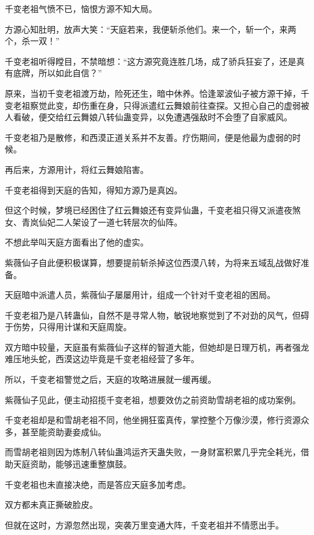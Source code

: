 
\begin{this_body}

千变老祖气愤不已，恼恨方源不知大局。

方源心知肚明，放声大笑：“天庭若来，我便斩杀他们。来一个，斩一个，来两个，杀一双！”

千变老祖听得瞠目，不禁暗想：“这方源究竟连胜几场，成了骄兵狂妄了，还是真有底牌，所以如此自信？”

原来，当初千变老祖渡万劫，险死还生，暗中休养。恰逢翠波仙子被方源干掉，千变老祖察觉此变，却伤重在身，只得派遣红云舞娘前往查探。又担心自己的虚弱被人看破，便交给红云舞娘八转仙蛊变异，以免遭遇强敌时不会堕了自家威风。

千变老祖乃是散修，和西漠正道关系并不友善。疗伤期间，便是他最为虚弱的时候。

再后来，方源用计，将红云舞娘陷害。

千变老祖得到天庭的告知，得知方源乃是真凶。

但这个时候，梦境已经困住了红云舞娘还有变异仙蛊，千变老祖只得又派遣夜煞女、青岚仙妃二人架设了一道七转层次的仙阵。

不想此举叫天庭方面看出了他的虚实。

紫薇仙子自此便积极谋算，想要提前斩杀掉这位西漠八转，为将来五域乱战做好准备。

天庭暗中派遣人员，紫薇仙子屡屡用计，组成一个针对千变老祖的困局。

千变老祖乃是八转蛊仙，自然不是寻常人物，敏锐地察觉到了不对劲的风气，但碍于伤势，只得用计谋和天庭周旋。

双方暗中较量，天庭虽有紫薇仙子这样的智道大能，但她却是日理万机，再者强龙难压地头蛇，西漠这边毕竟是千变老祖经营了多年。

所以，千变老祖警觉之后，天庭的攻略进展就一缓再缓。

紫薇仙子见此，便主动招揽千变老祖，想要效仿之前资助雪胡老祖的成功案例。

千变老祖却是和雪胡老祖不同，他坐拥狂蛮真传，掌控整个万像沙漠，修行资源众多，甚至能资助妻妾成仙。

而雪胡老祖则因为炼制八转仙蛊鸿运齐天蛊失败，一身财富积累几乎完全耗光，借助天庭资助，能够迅速重整旗鼓。

千变老祖也未直接决绝，而是答应天庭多加考虑。

双方都未真正撕破脸皮。

但就在这时，方源忽然出现，突袭万里变通大阵，千变老祖并不情愿出手。


\end{this_body}
